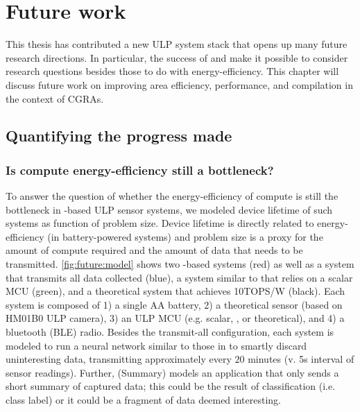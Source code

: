 \chapter{Future work}
\label{chapter:future}
This thesis has contributed a new ULP system stack that opens up many future research directions.
% 
In particular, the success of \snafu and \riptide make it possible to consider research questions besides those to do with energy-efficiency.
% 
This chapter will discuss future work on improving area efficiency, performance, and compilation in the context of CGRAs.

\figProgress
\section{Quantifying the progress made}

\figFutureModel
\subsection{Is compute energy-efficiency still a bottleneck?}
To answer the question of whether the energy-efficiency of compute is still the bottleneck in \riptide-based ULP sensor systems, we modeled device lifetime of such systems as function of problem size.
%
Device lifetime is directly related to energy-efficiency (in battery-powered systems) and problem size is a proxy for the amount of compute required and the amount of data that needs to be transmitted.
% 
\autoref{fig:future:model} shows two \riptide-based systems (red) as well as a system that transmits all data collected (blue), a system similar to \sonic that relies on a scalar MCU (green), and a theoretical system that achieves 10TOPS/W (black).
% 
Each system is composed of 1) a single AA battery, 2) a theoretical sensor (based on HM01B0 ULP camera), 3) an ULP MCU (e.g. scalar, \riptide, or theoretical), and 4) a bluetooth (BLE) radio.
% 
Besides the transmit-all configuration, each system is modeled to run a neural network similar to those in \sonic to smartly discard uninteresting data, transmitting approximately every $20$ minutes (v. 5s interval of sensor readings).
% 
Further, \riptide (Summary) models an application that only sends a short summary of captured data; this could be the result of classification (i.e. class label) or it could be a fragment of data deemed interesting.

